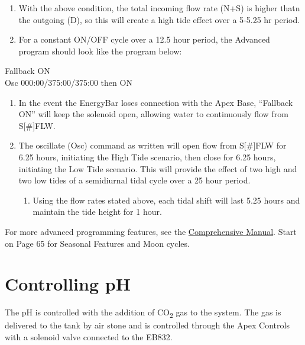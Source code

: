 \documentclass[]{book}
\providecommand{\tightlist}{%
  \setlength{\itemsep}{0pt}\setlength{\parskip}{0pt}}
\begin{document}
\begin{enumerate}
  \begin{enumerate}
  \def\labelenumii{\arabic{enumii}.}
  \tightlist
  \item
    With the above condition, the total incoming flow rate (N+S) is
    higher thatn the outgoing (D), so this will create a high tide
    effect over a 5-5.25 hr period.
  \item
    For a constant ON/OFF cycle over a 12.5 hour period, the Advanced
    program should look like the program below:
  \end{enumerate}
\end{enumerate}

Fallback ON\\
Osc 000:00/375:00/375:00 then ON

\begin{enumerate}
\def\labelenumi{\arabic{enumi}.}
\tightlist
\item
  In the event the EnergyBar loses connection with the Apex Base,
  ``Fallback ON'' will keep the solenoid open, allowing water to
  continuously flow from S{[}\#{]}FLW.\\
\item
  The oscillate (Osc) command as written will open flow from
  S{[}\#{]}FLW for 6.25 hours, initiating the High Tide scenario, then
  close for 6.25 hours, initiating the Low Tide scenario. This will
  provide the effect of two high and two low tides of a semidiurnal
  tidal cycle over a 25 hour period.

  \begin{enumerate}
  \def\labelenumii{\arabic{enumii}.}
  \tightlist
  \item
    Using the flow rates stated above, each tidal shift will last 5.25
    hours and maintain the tide height for 1 hour.
  \end{enumerate}
\end{enumerate}

For more advanced programming features, see the
\href{https://github.com/SilbigerLab/Mesocosm_User_Manual/tree/7503b88686aef920c4a4ed473b1efe37b34dae10/Manuals/Apex_Comprehensive_Reference_Manual.pdf}{Comprehensive
Manual}. Start on Page 65 for Seasonal Features and Moon cycles.

\chapter{Controlling pH}\label{controlling-ph}

The pH is controlled with the addition of CO\textsubscript{2} gas to the
system. The gas is delivered to the tank by air stone and is controlled
through the Apex Controls with a solenoid valve connected to the EB832.
\end{document}
